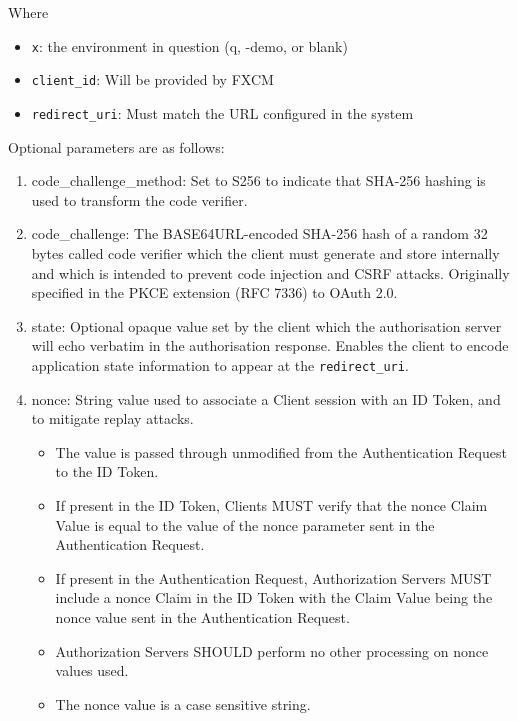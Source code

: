 \documentclass[11pt]{article}
\begin{document}
Where

\begin{itemize}
    \item \verb|x|: the environment in question (q, -demo, or blank) 
    \item \verb|client_id|: Will be provided by FXCM
    \item \verb|redirect_uri|: Must match the URL configured in the system
\end{itemize}

Optional parameters are as follows:

\begin{enumerate}
    \item code\_challenge\_method: Set to S256 to indicate that SHA-256 hashing is used to transform the code verifier.
    \item code\_challenge: The BASE64URL-encoded SHA-256 hash of a random 32 bytes called code verifier which the client must generate and store internally and which is intended to prevent code injection and CSRF attacks. Originally specified in the PKCE extension (RFC 7336) to OAuth 2.0.
    \item state: Optional opaque value set by the client which the authorisation server will echo verbatim in the authorisation response. Enables the client to encode application state information to appear at the \verb|redirect_uri|.
    \item nonce: String value used to associate a Client session with an ID Token, and to mitigate replay attacks. 
    \begin{itemize}
        \item The value is passed through unmodified from the Authentication Request to the ID Token. 
        \item If present in the ID Token, Clients MUST verify that the nonce Claim Value is equal to the value of the nonce parameter sent in the Authentication Request. 
        \item If present in the Authentication Request, Authorization Servers MUST include a nonce Claim in the ID Token with the Claim Value being the nonce value sent in the Authentication Request. \item Authorization Servers SHOULD perform no other processing on nonce values used. 
        \item The nonce value is a case sensitive string.
    \end{itemize}
\end{enumerate}
\end{document}
